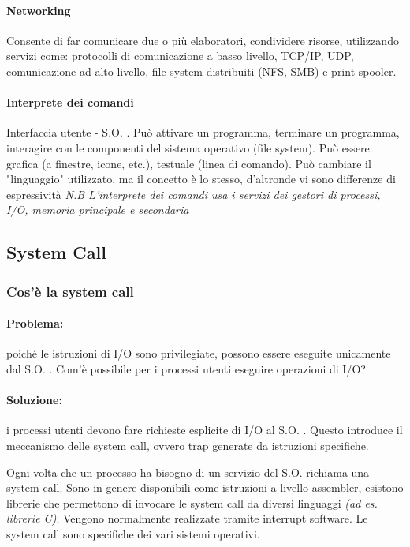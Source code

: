 \paragraph{Networking}
Consente di far comunicare due o più elaboratori, condividere risorse, utilizzando servizi come: protocolli di comunicazione a basso livello, TCP/IP, UDP, comunicazione ad alto livello, file system distribuiti (NFS, SMB) e print spooler.

\paragraph{Interprete dei comandi}
Interfaccia utente - S.O. .
Può attivare un programma, terminare un programma, interagire con le componenti del sistema operativo (file system).
Può essere: grafica (a finestre, icone, etc.), testuale (linea di comando).
Può cambiare il "linguaggio" utilizzato, ma il concetto è lo stesso, d'altronde vi sono differenze di espressività
\newline
\small\textit{N.B L'interprete dei comandi usa i servizi dei gestori di processi, I/O, memoria principale e secondaria}

\subsection{System Call}

\subsubsection{Cos'è la system call}
\paragraph{Problema:} poiché le istruzioni di I/O sono privilegiate, possono essere eseguite unicamente dal S.O. . Com'è possibile per i processi utenti eseguire operazioni di I/O?
\paragraph{Soluzione:} i processi utenti devono fare richieste esplicite di I/O al S.O. . Questo introduce il meccanismo delle system call, ovvero trap generate da istruzioni specifiche.
\newline

Ogni volta che un processo ha bisogno di un servizio del S.O.
richiama una system call. Sono in genere disponibili come istruzioni a livello assembler, esistono librerie che permettono di invocare le system call da diversi linguaggi \textit{(ad es. librerie C)}.
Vengono normalmente realizzate tramite interrupt software.
Le system call sono specifiche dei vari sistemi operativi.
\newline

